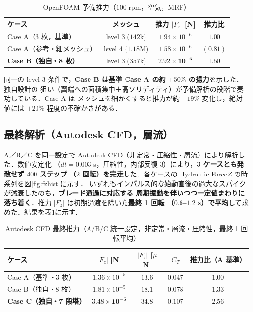 \documentclass[a4paper,11pt]{jsarticle}
\begin{document}
\begin{table}[htbp]
  \centering
  \caption{OpenFOAM 予備推力（$100$ rpm，空気，MRF）}
  \begin{tabular}{l|ccc}
    \hline
    ケース & メッシュ & 推力 $|F_z|$ [N] & 推力比 \\
    \hline
    Case A（3 枚，基準） & level 3 ($142$k) & $1.94\times10^{-6}$ & $1.00$ \\
    Case A（参考・細メッシュ） & level 4 ($1.18$M) & $1.58\times10^{-6}$ & $(0.81)$ \\
    \textbf{Case B（独自・8 枚）} & level 3 ($357$k) & $\bm{2.92\times10^{-6}}$ & $\bm{1.50}$ \\
    \hline
  \end{tabular}
\end{table}

同一の level 3 条件で，\textbf{Case B は基準 Case A の約 $+50\%$ の揚力}を示した．独自設計の
狙い（翼端への面積集中＋高ソリディティ）が予備解析の段階で奏功している．Case A は
メッシュを細かくすると推力が約 $-19\%$ 変化し，絶対値には $\pm20\%$ 程度の不確かさがある．

\subsection{最終解析（Autodesk CFD，層流）}

A／B／C を同一設定で Autodesk CFD（非定常・圧縮性・層流）により解析した．数値安定化
（$dt=0.003$ s，圧縮性，内部反復 3）により，\textbf{3 ケースとも発散せず $400$ ステップ
（$2$ 回転）を完走}した．各ケースの Hydraulic Force$Z$ の時系列を図\ref{fig:fzhist}に示す．
いずれもインパルス的な始動直後の過大なスパイクが減衰したのち，\textbf{ブレード通過に対応する
周期振動を伴いつつ一定値まわりに落ち着く}．推力 $|F_z|$ は初期過渡を除いた\textbf{最終 1 回転
（$0.6$--$1.2$ s）で平均}して求めた．結果を表\ref{tab:cfd}に示す．

\begin{table}[htbp]
  \centering
  \caption{Autodesk CFD 最終推力（A/B/C 統一設定，非定常・層流・圧縮性，最終 1 回転平均）}
  \label{tab:cfd}
  \begin{tabular}{l|cccc}
    \hline
    ケース & $|F_z|$ [N] & $|F_z|$ [$\mu$N] & $C_T$ & 推力比（A 基準） \\
    \hline
    Case A（基準・3 枚） & $1.36\times10^{-5}$ & $13.6$ & $0.047$ & $1.00$ \\
    Case B（独自・8 枚） & $1.81\times10^{-5}$ & $18.1$ & $0.078$ & $1.33$ \\
    \textbf{Case C（独自・7 段塔）} & $\bm{3.48\times10^{-5}}$ & $\bm{34.8}$ & $\bm{0.107}$ & $\bm{2.56}$ \\
    \hline
  \end{tabular}
\end{table}
\end{document}

